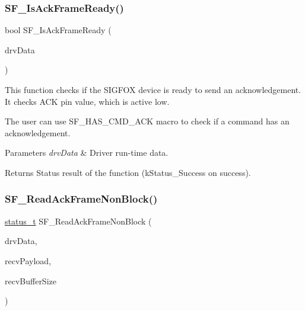 \subsubsection{\texorpdfstring{SF\_IsAckFrameReady()}{SF\_IsAckFrameReady()}}
{\footnotesize\ttfamily bool S\+F\+\_\+\+Is\+Ack\+Frame\+Ready (\begin{DoxyParamCaption}\item[{\mbox{\hyperlink{structsf__drv__data__t}{sf\+\_\+drv\+\_\+data\+\_\+t}} $\ast$}]{drv\+Data }\end{DoxyParamCaption})}



This function checks if the S\+I\+G\+F\+OX device is ready to send an acknowledgement. It checks A\+CK pin value, which is active low. 

The user can use S\+F\+\_\+\+H\+A\+S\+\_\+\+C\+M\+D\+\_\+\+A\+CK macro to check if a command has an acknowledgement.


\begin{DoxyParams}{Parameters}
{\em drv\+Data} & Driver run-\/time data.\\
\hline
\end{DoxyParams}
\begin{DoxyReturn}{Returns}
Status result of the function (k\+Status\+\_\+\+Success on success). 
\end{DoxyReturn}
\mbox{\label{group__sf__functions__group_gaea7699d331c28a9e9f708d8d859cacf5}} 
\subsubsection{\texorpdfstring{SF\_ReadAckFrameNonBlock()}{SF\_ReadAckFrameNonBlock()}}
{\footnotesize\ttfamily \mbox{\hyperlink{group__ksdk__common_gaaabdaf7ee58ca7269bd4bf24efcde092}{status\+\_\+t}} S\+F\+\_\+\+Read\+Ack\+Frame\+Non\+Block (\begin{DoxyParamCaption}\item[{\mbox{\hyperlink{structsf__drv__data__t}{sf\+\_\+drv\+\_\+data\+\_\+t}} $\ast$}]{drv\+Data,  }\item[{\mbox{\hyperlink{structsf__msg__payload__t}{sf\+\_\+msg\+\_\+payload\+\_\+t}} $\ast$}]{recv\+Payload,  }\item[{uint8\+\_\+t}]{recv\+Buffer\+Size }\end{DoxyParamCaption})}




